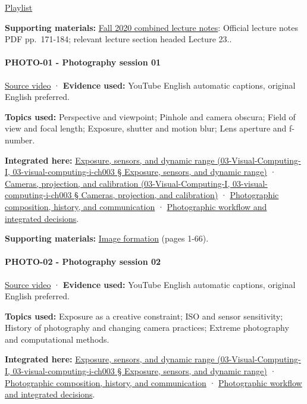\href{https://www.youtube.com/playlist?list=PL7ddpXYvFXspUN0N-gObF1GXoCA-DA-7i}{Playlist}

\textbf{Supporting materials:} \href{https://ocw.mit.edu/courses/6-801-machine-vision-fall-2020/9ec44f69e72995c370b3797818ba01e6_MIT6_801F20_lectureNotes.pdf}{Fall 2020 combined lecture notes}: Official lecture notes PDF pp.~171-184; relevant lecture section headed Lecture 23..

\paragraph{PHOTO-01 - Photography session 01}\label{photo-01---photography-session-01}

\href{https://www.youtube.com/watch?v=y7HrM-fk_Rc}{Source video} · \textbf{Evidence used:} YouTube English automatic captions, original English preferred.

\textbf{Topics used:} Perspective and viewpoint; Pinhole and camera obscura; Field of view and focal length; Exposure, shutter and motion blur; Lens aperture and f-number.

\textbf{Integrated here:} \href{}{Exposure, sensors, and dynamic range (03-Visual-Computing-I, 03-visual-computing-i-ch003 § Exposure, sensors, and dynamic range)} · \href{}{Cameras, projection, and calibration (03-Visual-Computing-I, 03-visual-computing-i-ch003 § Cameras, projection, and calibration)} · \hyperref[04-visual-computing-ii-ch034]{Photographic composition, history, and communication} · \hyperref[04-visual-computing-ii-ch034]{Photographic workflow and integrated decisions}.

\textbf{Supporting materials:} \href{https://drive.google.com/file/d/0B6w2XfPHEcZYdVd4anZzZTc3aE0/view?usp=sharing}{Image formation} (pages 1-66).

\paragraph{PHOTO-02 - Photography session 02}\label{photo-02---photography-session-02}

\href{https://www.youtube.com/watch?v=d_sJFslHQsg}{Source video} · \textbf{Evidence used:} YouTube English automatic captions, original English preferred.

\textbf{Topics used:} Exposure as a creative constraint; ISO and sensor sensitivity; History of photography and changing camera practices; Extreme photography and computational methods.

\textbf{Integrated here:} \href{}{Exposure, sensors, and dynamic range (03-Visual-Computing-I, 03-visual-computing-i-ch003 § Exposure, sensors, and dynamic range)} · \hyperref[04-visual-computing-ii-ch034]{Photographic composition, history, and communication} · \hyperref[04-visual-computing-ii-ch034]{Photographic workflow and integrated decisions}.


